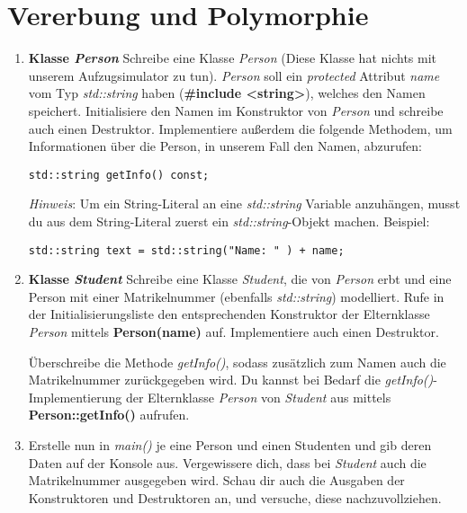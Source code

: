 

\newcommand{\tag}{3}

\cppSetTitle


	
\cppSetHeaderAndMakeTitle  

\vspace{5mm}

\section{Vererbung und Polymorphie}
\begin{enumerate}
\item \textbf{Klasse \emph{Person}}
Schreibe eine Klasse \emph{Person} (Diese Klasse hat nichts mit unserem Aufzugsimulator zu tun).
\emph{Person} soll ein \emph{protected} Attribut \emph{name} vom Typ \emph{std::string} haben (\textbf{\#include <string>}), welches den Namen speichert. 
Initialisiere den Namen im Konstruktor von \emph{Person} und schreibe auch einen Destruktor.
Implementiere außerdem die folgende Methodem, um Informationen über die Person, in unserem Fall den Namen, abzurufen:
\begin{lstlisting}
std::string getInfo() const;
\end{lstlisting}

\emph{Hinweis}: Um ein String-Literal an eine \emph{std::string} Variable anzuhängen, musst du aus dem String-Literal zuerst ein \emph{std::string}-Objekt machen.
Beispiel:
\begin{lstlisting}
std::string text = std::string("Name: " ) + name;
\end{lstlisting}

\item \textbf{Klasse \emph{Student}}
Schreibe eine Klasse \emph{Student}, die von \emph{Person} erbt und eine Person mit einer Matrikelnummer (ebenfalls \emph{std::string}) modelliert.
Rufe in der Initialisierungsliste den entsprechenden Konstruktor der Elternklasse \emph{Person} mittels \textbf{Person(name)} auf.
Implementiere auch einen Destruktor. 

Überschreibe die Methode \emph{getInfo()}, sodass zusätzlich zum Namen auch die Matrikelnummer zurückgegeben wird.
Du kannst bei Bedarf die \emph{getInfo()}-Implementierung der Elternklasse \emph{Person} von \emph{Student} aus mittels \textbf{Person::getInfo()} aufrufen.

\item 
Erstelle nun in \emph{main()} je eine Person und einen Studenten und gib deren Daten auf der Konsole aus.
Vergewissere dich, dass bei \emph{Student} auch die Matrikelnummer ausgegeben wird.
Schau dir auch die Ausgaben der Konstruktoren und Destruktoren an, und versuche, diese nachzuvollziehen.


\end{enumerate}
